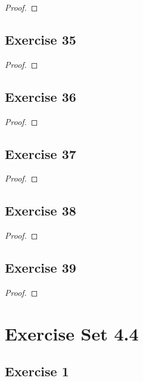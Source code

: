 \documentclass[14pt]{extarticle}
\begin{document}
\begin{proof}

\end{proof}

\subsection{Exercise 35}

\begin{proof}

\end{proof}

\subsection{Exercise 36}

\begin{proof}

\end{proof}

\subsection{Exercise 37}

\begin{proof}

\end{proof}

\subsection{Exercise 38}

\begin{proof}

\end{proof}

\subsection{Exercise 39}

\begin{proof}

\end{proof}

\section{Exercise Set 4.4}

\subsection{Exercise 1}
\end{document}
